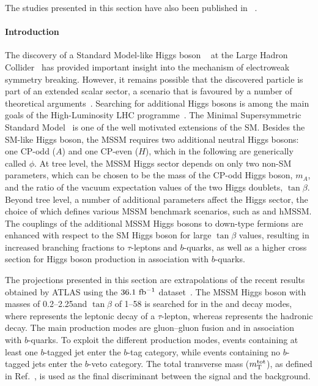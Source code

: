 The studies presented in this section have also been published in ~\cite{ATL-PHYS-PUB-2018-050}.

\paragraph{Introduction}

The discovery of a Standard Model-like Higgs boson ~\cite{ATLASHiggsJuly2012, CMSHiggsJuly2012}
at the Large Hadron Collider~\cite{LHC} has provided important insight into the mechanism of
electroweak symmetry breaking. However, it remains possible that the discovered particle is part
of an extended scalar sector, a scenario that is favoured by a number of theoretical arguments~\cite{Djouadi:2005gj,Branco:2011iw}.
Searching for additional Higgs bosons is among the main goals of
the High-Luminosity LHC programme~\cite{ecfa15}. The Minimal Supersymmetric Standard
Model~\cite{Djouadi:2005gj,Fayet:1976et,Fayet:1977yc} is one of the well motivated extensions
of the SM\@. Besides the SM-like Higgs boson, the MSSM requires two additional neutral Higgs bosons:
one CP-odd ($A$) and one CP-even ($H$), which in the following are generically called $\phi$.
At tree level, the MSSM Higgs sector depends on only two non-SM parameters, which can be chosen
to be the mass of the CP-odd Higgs boson, $m_A$, and the ratio of the vacuum expectation values
of the two Higgs doublets, $\tan\beta$. Beyond tree level, a number of additional parameters
affect the Higgs sector, the choice of which defines various MSSM benchmark scenarios, such as \mhmodp and hMSSM.
The couplings of the additional MSSM Higgs bosons to down-type fermions are enhanced with respect to
the SM Higgs boson for large $\tan\beta$ values, resulting in increased branching fractions to
$\tau$-leptons and $b$-quarks, as well as a higher cross section for Higgs boson production
in association with $b$-quarks.

The projections presented in this section are extrapolations of the recent results obtained by ATLAS using
the $36.1~\mbox{fb$^{-1}$}$ \RunTwo dataset~\cite{ATLASRun2Ditau}.  The MSSM Higgs boson with masses of
0.2--2.25\TeV and $\tan\beta$ of 1--58 is searched for in the \lephad and \hadhad decay modes,
where \taulep represents the leptonic decay of a $\tau$-lepton, whereas \tauhad represents the hadronic decay.
The main production modes are gluon--gluon fusion and in association with $b$-quarks.
To exploit the different production modes, events containing at least one $b$-tagged jet enter the $b$-tag
category, while events containing no $b$-tagged jets enter the $b$-veto category. The total transverse
mass ($m_\textnormal{T}^\textnormal{tot}$), as defined in Ref.~\cite{ATLASRun2Ditau}, is used as the final discriminant between
the signal and the background.

